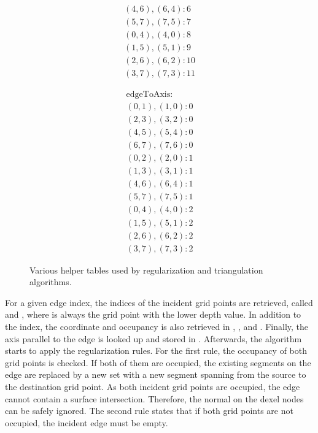\begin{figure}
\begin{subfigure}[t]{0.24\textwidth}
\begin{align*}
		(4, 6), (6, 4):  6 \\
		(5, 7), (7, 5):  7 \\
		(0, 4), (4, 0):  8 \\
		(1, 5), (5, 1):  9 \\
		(2, 6), (6, 2): 10 \\
		(3, 7), (7, 3): 11
		\end{align*}
	\end{subfigure}
	\begin{subfigure}[t]{0.24\textwidth}
		\begin{align*}
		\text{edgeToAxis:} \\
		(0, 1), (1, 0): 0 \\
		(2, 3), (3, 2): 0 \\
		(4, 5), (5, 4): 0 \\
		(6, 7), (7, 6): 0 \\
		(0, 2), (2, 0): 1 \\
		(1, 3), (3, 1): 1 \\
		(4, 6), (6, 4): 1 \\
		(5, 7), (7, 5): 1 \\
		(0, 4), (4, 0): 2 \\
		(1, 5), (5, 1): 2 \\
		(2, 6), (6, 2): 2 \\
		(3, 7), (7, 3): 2
		\end{align*}
	\end{subfigure}
	\caption{
		Various helper tables used by regularization and triangulation algorithms.
	}
	\label{fig:tri_dexel_tables}
\end{figure}
%
For a given edge index, the indices of the incident grid points are retrieved, called  and , where  is always the grid point with the lower depth value.
In addition to the index, the coordinate and occupancy is also retrieved in , ,  and .
Finally, the axis parallel to the edge is looked up and stored in .
Afterwards, the algorithm starts to apply the regularization rules.
%
For the first rule, the occupancy of both grid points is checked.
If both of them are occupied, the existing segments on the edge are replaced by a new set with a new segment spanning from the source to the destination grid point.
As both incident grid points are occupied, the edge cannot contain a surface intersection.
Therefore, the normal on the dexel nodes can be safely ignored.
%
The second rule states that if both grid points are not occupied, the incident edge must be empty.
